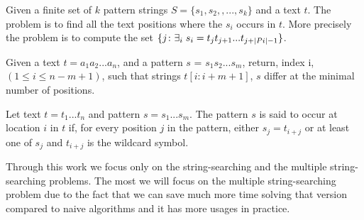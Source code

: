 \begin{problem} \cite{multiString} Given a finite set of $k$ pattern strings $S = \{s_1, s_2, ,..., s_k\}$ and a text $t$. The problem is to find all the text positions where the $s_i$ occurs in $t$. More precisely the problem is to compute the set $\{ j \colon \exists_i \hspace{1mm} s_i = t_jt_{j+1}...t_{j+|Pi|-1}\}$.
\end{problem}

\begin{problem} \cite{missMatch}
Given a text $t = a_1a_2...a_n$, and a pattern $s$ = $s_1s_2...s_m$, return, index i, $(1 \leq i \leq n-m+1)$, such that strings $t[i : i+m+1]$, $s$ differ at the minimal number of positions.
\end{problem}

\begin{problem} \cite{wildcardsMatch}
    Let text $t= t_1...t_n$ and pattern $s = s_1...s_m$. The pattern $s$ is said to occur at location $i$ in $t$ if, for every position $j$ in the pattern, either $s_j = t_{i+j}$
or at least one of $s_j$ and $t_{i+j}$ is the wildcard symbol.
\end{problem}

Through this work we focus only on the string-searching and the multiple string-searching problems. The most we will focus on the multiple string-searching problem due to the fact that we can save much more time solving that version compared to naive algorithms and it has more usages in practice.